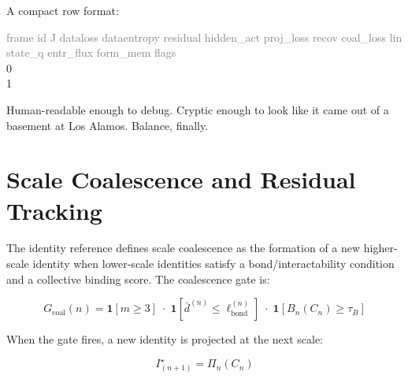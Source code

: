 \documentclass[11pt,a4paper]{article}
\begin{document}
\vspace{8pt}\noindent A compact row format:

\begin{databox}
{\ttfamily\footnotesize
\textcolor{gray}{frame id J \; dataloss dataentropy residual hidden\_act proj\_loss recov coal\_loss lin state\_q entr\_flux form\_mem flags}\\
0              \\
1              }
\end{databox}

Human-readable enough to debug. Cryptic enough to look like it came out of a basement at
Los Alamos. Balance, finally.

\section{Scale Coalescence and Residual Tracking}

The identity reference defines scale coalescence as the formation of a new higher-scale
identity when lower-scale identities satisfy a bond/interactability condition and a collective
binding score. The coalescence gate is:

\begin{eqbox}
\[G_{\text{coal}}(n)=\mathbf{1}[m\geq3]\;\cdot\;
\mathbf{1}\!\left[\bar{d}^{(n)}\leq\ell_{\text{bond}}^{(n)}\right]\;\cdot\;
\mathbf{1}\!\left[B_n(C_n)\geq\tau_B\right]\]
\end{eqbox}

When the gate fires, a new identity is projected at the next scale:

\begin{eqbox}
\[I^{\star}_{(n+1)}=\Pi_n(C_n)\]
\end{eqbox}
\end{document}
